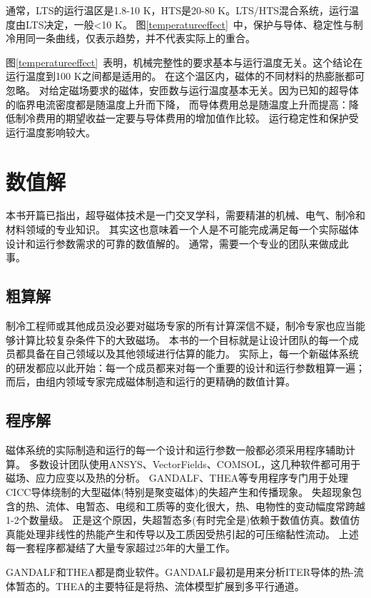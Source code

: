 通常，LTS的运行温区是1.8-10 K，HTS是20-80 K。LTS/HTS混合系统，运行温度由LTS决定，一般<10 K。
图\ref{temperatureeffect}~中，保护与导体、稳定性与制冷用同一条曲线，仅表示趋势，并不代表实际上的重合。

图\ref{temperatureeffect}~表明，机械完整性的要求基本与运行温度无关。这个结论在运行温度到100 K之间都是适用的。
在这个温区内，磁体的不同材料的热膨胀都可忽略。
对给定磁场要求的磁体，安匝数与运行温度基本无关。因为已知的超导体的临界电流密度都是随温度上升而下降，
而导体费用总是随温度上升而提高：降低制冷费用的期望收益一定要与导体费用的增加值作比较。
运行稳定性和保护受运行温度影响较大。

\section{数值解}
本书开篇已指出，超导磁体技术是一门交叉学科，需要精湛的机械、电气、制冷和材料领域的专业知识。
其实这也意味着一个人是不可能完成满足每一个实际磁体设计和运行参数需求的可靠的数值解的。
通常，需要一个专业的团队来做成此事。
\subsection{粗算解}
制冷工程师或其他成员没必要对磁场专家的所有计算深信不疑，制冷专家也应当能够计算比较复杂条件下的大致磁场。
本书的一个目标就是让设计团队的每一个成员都具备在自己领域以及其他领域进行估算的能力。
实际上，每一个新磁体系统的研发都应以此开始：每一个成员都来对每一个重要的设计和运行参数粗算一遍；
而后，由组内领域专家完成磁体制造和运行的更精确的数值计算。

\subsection{程序解}
磁体系统的实际制造和运行的每一个设计和运行参数一般都必须采用程序辅助计算。
多数设计团队使用ANSYS、VectorFields、COMSOL，这几种软件都可用于磁场、应力应变以及热的分析。
GANDALF、THEA等专用程序专门用于处理CICC导体绕制的大型磁体(特别是聚变磁体)的失超产生和传播现象。
失超现象包含的热、流体、电暂态、电缆和工质等的变化很大，热、电物性的变动幅度常跨越1-2个数量级。
正是这个原因，失超暂态多(有时完全是)依赖于数值仿真。数值仿真能处理非线性的热能产生和传导以及工质因受热引起的可压缩黏性流动。
上述每一套程序都凝结了大量专家超过25年的大量工作。

GANDALF和THEA都是商业软件。GANDALF最初是用来分析ITER导体的热-流体暂态的。THEA的主要特征是将热、流体模型扩展到多平行通道。

